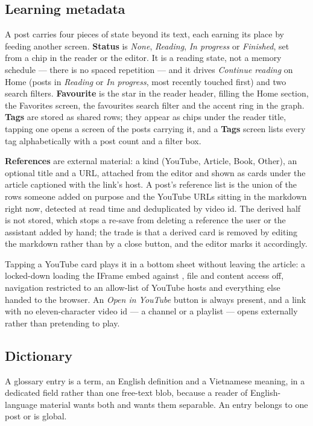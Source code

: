 \subsection{Learning metadata}

A post carries four pieces of state beyond its text, each earning its place by feeding another
screen. \textbf{Status} is \emph{None}, \emph{Reading}, \emph{In progress} or \emph{Finished}, set
from a chip in the reader or the editor. It is a reading state, not a memory schedule --- there is no
spaced repetition --- and it drives \emph{Continue reading} on Home (posts in \emph{Reading} or
\emph{In progress}, most recently touched first) and two search filters. \textbf{Favourite} is the
star in the reader header, filling the Home section, the Favorites screen, the favourites search
filter and the accent ring in the graph. \textbf{Tags} are stored as shared rows; they appear as
chips under the reader title, tapping one opens a screen of the posts carrying it, and a
\textbf{Tags} screen lists every tag alphabetically with a post count and a filter box.

\textbf{References} are external material: a kind (YouTube, Article, Book, Other), an optional
title and a URL, attached from the editor and shown as cards under the article captioned with the
link's host. A post's reference list is the union of the rows someone added on purpose and the
YouTube URLs sitting in the markdown right now, detected at read time and deduplicated by video id.
The derived half is not stored, which stops a re-save from deleting a reference the user or the
assistant added by hand; the trade is that a derived card is removed by editing the markdown rather
than by a close button, and the editor marks it accordingly.

Tapping a YouTube card plays it in a bottom sheet without leaving the article: a locked-down
 loading the IFrame embed against , file and content
access off, navigation restricted to an allow-list of YouTube hosts and everything else handed to
the browser. An \emph{Open in YouTube} button is always present, and a link with no
eleven-character video id --- a channel or a playlist --- opens externally rather than pretending to
play.

\subsection{Dictionary}

A glossary entry is a term, an English definition and a Vietnamese meaning, in a dedicated
 field rather than one free-text blob, because a reader of English-language
material wants both and wants them separable. An entry belongs to one post or is global.

